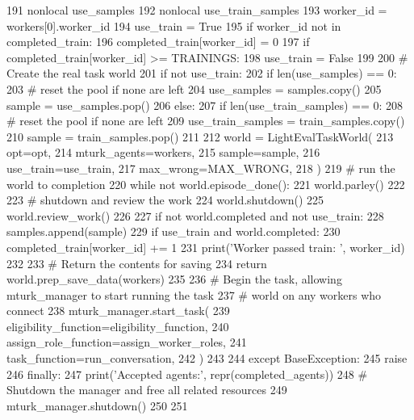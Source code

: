 \begin{DoxyCode}
191             nonlocal use\_samples
192             nonlocal use\_train\_samples
193             worker\_id = workers[0].worker\_id
194             use\_train = \textcolor{keyword}{True}
195             \textcolor{keywordflow}{if} worker\_id \textcolor{keywordflow}{not} \textcolor{keywordflow}{in} completed\_train:
196                 completed\_train[worker\_id] = 0
197             \textcolor{keywordflow}{if} completed\_train[worker\_id] >= TRAININGS:
198                 use\_train = \textcolor{keyword}{False}
199 
200             \textcolor{comment}{# Create the real task world}
201             \textcolor{keywordflow}{if} \textcolor{keywordflow}{not} use\_train:
202                 \textcolor{keywordflow}{if} len(use\_samples) == 0:
203                     \textcolor{comment}{# reset the pool if none are left}
204                     use\_samples = samples.copy()
205                 sample = use\_samples.pop()
206             \textcolor{keywordflow}{else}:
207                 \textcolor{keywordflow}{if} len(use\_train\_samples) == 0:
208                     \textcolor{comment}{# reset the pool if none are left}
209                     use\_train\_samples = train\_samples.copy()
210                 sample = train\_samples.pop()
211 
212             world = LightEvalTaskWorld(
213                 opt=opt,
214                 mturk\_agents=workers,
215                 sample=sample,
216                 use\_train=use\_train,
217                 max\_wrong=MAX\_WRONG,
218             )
219             \textcolor{comment}{# run the world to completion}
220             \textcolor{keywordflow}{while} \textcolor{keywordflow}{not} world.episode\_done():
221                 world.parley()
222 
223             \textcolor{comment}{# shutdown and review the work}
224             world.shutdown()
225             world.review\_work()
226 
227             \textcolor{keywordflow}{if} \textcolor{keywordflow}{not} world.completed \textcolor{keywordflow}{and} \textcolor{keywordflow}{not} use\_train:
228                 samples.append(sample)
229             \textcolor{keywordflow}{if} use\_train \textcolor{keywordflow}{and} world.completed:
230                 completed\_train[worker\_id] += 1
231                 print(\textcolor{stringliteral}{'Worker passed train: '}, worker\_id)
232 
233             \textcolor{comment}{# Return the contents for saving}
234             \textcolor{keywordflow}{return} world.prep\_save\_data(workers)
235 
236         \textcolor{comment}{# Begin the task, allowing mturk\_manager to start running the task}
237         \textcolor{comment}{# world on any workers who connect}
238         mturk\_manager.start\_task(
239             eligibility\_function=eligibility\_function,
240             assign\_role\_function=assign\_worker\_roles,
241             task\_function=run\_conversation,
242         )
243 
244     \textcolor{keywordflow}{except} BaseException:
245         \textcolor{keywordflow}{raise}
246     \textcolor{keywordflow}{finally}:
247         print(\textcolor{stringliteral}{'Accepted agents:'}, repr(completed\_agents))
248         \textcolor{comment}{# Shutdown the manager and free all related resources}
249         mturk\_manager.shutdown()
250 
251 
\end{DoxyCode}
